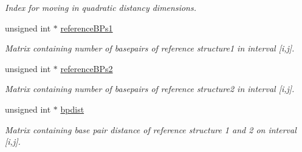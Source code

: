 \begin{DoxyCompactItemize}
\begin{DoxyCompactList}\small\item\em Index for moving in quadratic distancy dimensions. \end{DoxyCompactList}\item 
\hypertarget{group__kl__neighborhood__mfe_a536525b98c1b633d4c5f2da4f8d78c18}{unsigned int $\ast$ \hyperlink{group__kl__neighborhood__mfe_a536525b98c1b633d4c5f2da4f8d78c18}{reference\-B\-Ps1}}\label{group__kl__neighborhood__mfe_a536525b98c1b633d4c5f2da4f8d78c18}

\begin{DoxyCompactList}\small\item\em Matrix containing number of basepairs of reference structure1 in interval \mbox{[}i,j\mbox{]}. \end{DoxyCompactList}\item 
\hypertarget{group__kl__neighborhood__mfe_aa7abf73c3114cb5f0dc90e702fa9dd0f}{unsigned int $\ast$ \hyperlink{group__kl__neighborhood__mfe_aa7abf73c3114cb5f0dc90e702fa9dd0f}{reference\-B\-Ps2}}\label{group__kl__neighborhood__mfe_aa7abf73c3114cb5f0dc90e702fa9dd0f}

\begin{DoxyCompactList}\small\item\em Matrix containing number of basepairs of reference structure2 in interval \mbox{[}i,j\mbox{]}. \end{DoxyCompactList}\item 
\hypertarget{group__kl__neighborhood__mfe_af1106e1a592e2dccc92b3452340549e0}{unsigned int $\ast$ \hyperlink{group__kl__neighborhood__mfe_af1106e1a592e2dccc92b3452340549e0}{bpdist}}\label{group__kl__neighborhood__mfe_af1106e1a592e2dccc92b3452340549e0}

\begin{DoxyCompactList}\small\item\em Matrix containing base pair distance of reference structure 1 and 2 on interval \mbox{[}i,j\mbox{]}. \end{DoxyCompactList}\end{DoxyCompactItemize}


